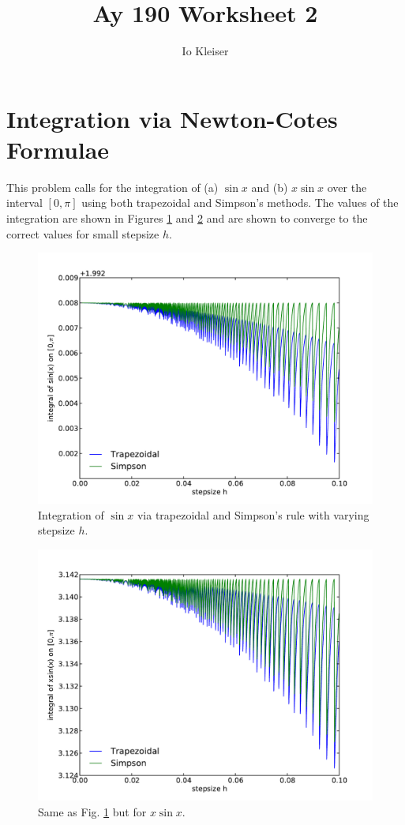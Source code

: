 \documentclass[12pt,preprint]{aastex}
\begin{document}

\title {Ay 190 Worksheet 2} 

\author{Io Kleiser}  

\section{Integration via Newton-Cotes Formulae}
This problem calls for the integration of (a) $\sin x$ and (b) $x \sin x$ over the interval $[0,\pi]$ using both trapezoidal and Simpson's methods. The values of the integration are shown in Figures \ref{f:trapsimp_sinx} and \ref{f:trapsimp_xsinx} and are shown to converge to the correct values for small stepsize $h$.

\begin{figure}[!ht]
\begin{center}
\includegraphics[width=6in]{trapsimp_sinx.pdf}
\end{center}
\caption{Integration of $\sin x$ via trapezoidal and Simpson's rule with varying stepsize $h$. \label{f:trapsimp_sinx}}
\end{figure}

\begin{figure}[!ht]
\begin{center}
\includegraphics[width=6in]{trapsimp_xsinx.pdf}
\end{center}
\caption{Same as Fig. \ref{f:trapsimp_sinx} but for $x \sin x$. \label{f:trapsimp_xsinx}}
\end{figure}

% 
%

%
\end{document}
